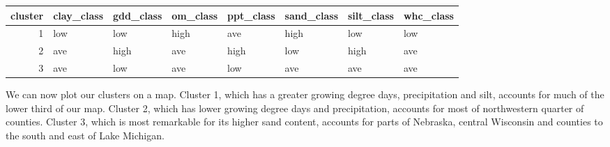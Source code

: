 \documentclass[
]{book}
\newenvironment{Shaded}{\begin{snugshade}}{\end{snugshade}}
\newcommand{\AttributeTok}[1]{\textcolor[rgb]{0.77,0.63,0.00}{#1}}
\newcommand{\ConstantTok}[1]{\textcolor[rgb]{0.00,0.00,0.00}{#1}}
\newcommand{\FunctionTok}[1]{\textcolor[rgb]{0.00,0.00,0.00}{#1}}
\newcommand{\NormalTok}[1]{#1}
\newcommand{\OtherTok}[1]{\textcolor[rgb]{0.56,0.35,0.01}{#1}}
\newcommand{\SpecialCharTok}[1]{\textcolor[rgb]{0.00,0.00,0.00}{#1}}
\newcommand{\StringTok}[1]{\textcolor[rgb]{0.31,0.60,0.02}{#1}}
\begin{document}
\begin{Shaded}
\end{Shaded}

\begin{tabular}[t]{r|l|l|l|l|l|l|l}
\hline
cluster & clay\_class & gdd\_class & om\_class & ppt\_class & sand\_class & silt\_class & whc\_class\\
\hline
1 & low & low & high & ave & high & low & low\\
\hline
2 & ave & high & ave & high & low & high & ave\\
\hline
3 & ave & low & ave & low & ave & ave & ave\\
\hline
\end{tabular}

We can now plot our clusters on a map. Cluster 1, which has a greater growing degree days, precipitation and silt, accounts for much of the lower third of our map. Cluster 2, which has lower growing degree days and precipitation, accounts for most of northwestern quarter of counties. Cluster 3, which is most remarkable for its higher sand content, accounts for parts of Nebraska, central Wisconsin and counties to the south and east of Lake Michigan.
\end{document}
